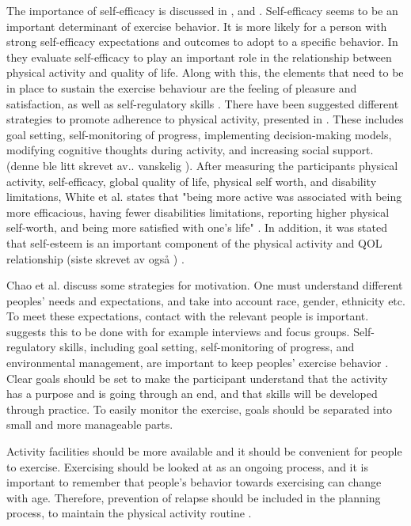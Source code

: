 The importance of self-efficacy is discussed in \cite{schutzer}, \cite{chao} and \cite{white}. Self-efficacy seems to be an important determinant of exercise behavior. It is more likely for a person with strong self-efficacy expectations and outcomes to adopt to a specific behavior. In \cite{white} they evaluate self-efficacy to play an important role in the relationship between physical activity and quality of life. Along with this, the elements that need to be in place to sustain  the exercise behaviour are the feeling of pleasure and satisfaction, as well as self-regulatory skills \cite{schutzer}. There have been suggested different strategies to promote adherence to physical activity, presented in \cite{chao}. These includes goal setting, self-monitoring of progress, implementing decision-making models, modifying cognitive thoughts during activity, and increasing social support. (denne ble litt skrevet av.. vanskelig \cite{chao}). After measuring the participants physical activity, self-efficacy, global quality of life, physical self worth, and disability limitations, White et al. states that "being more active was associated with being more efficacious, having fewer disabilities limitations, reporting higher physical self-worth, and being more satisfied with one's life" \cite{white}. In addition, it was stated that self-esteem is an important component of the physical activity and QOL relationship (siste skrevet av også ) \cite{white}. 

Chao et al. \cite{chao} discuss some strategies for motivation.  One must understand different peoples' needs and expectations, and take into account race, gender, ethnicity etc.  To meet these expectations, contact with the relevant people is important. \cite{chao} suggests this to be done with for example interviews and focus groups.  Self-regulatory skills, including goal setting, self-monitoring of progress, and environmental management, are important to keep peoples' exercise behavior \cite{chao}. Clear goals should be set to make the participant understand that the activity has a purpose and is going through an end, and that skills will be developed through practice. To easily monitor the exercise, goals should be separated into small and more manageable parts. 

Activity facilities should be more available and it should be convenient for people to exercise. Exercising should be looked at as an ongoing process, and it is important to remember that people's behavior towards exercising can change with age. Therefore, prevention of relapse should be included in the planning process, to maintain the physical activity routine \cite{chao}. 

